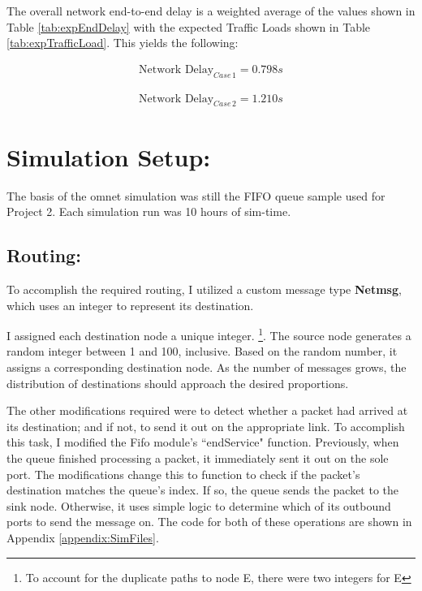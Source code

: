 \documentclass{article}
\begin{document}
The overall network end-to-end delay is a weighted average of the values shown in Table \ref{tab:expEndDelay} with the expected Traffic Loads shown in Table \ref{tab:expTrafficLoad}.
This yields the following:
\newline

\begin{minipage}{0.5\textwidth}
\begin{align*}
\text{Network Delay}_{Case \, 1} = 0.798s
\end{align*}
\end{minipage}
\begin{minipage}{0.5\textwidth}
\begin{align*}
\text{Network Delay}_{Case \, 2} = 1.210s
\end{align*}
\end{minipage}
\newline 

\newpage
\section{Simulation Setup:}
\label{sec:SimSetup}

The basis of the omnet simulation was still the FIFO queue sample used for Project 2.
Each simulation run was 10 hours of sim-time.

\subsection{Routing:}
\label{subsec:RoutingSetup}
To accomplish the required routing, I utilized a custom message type \textbf{Netmsg}, which uses an integer to represent its destination.

I assigned each destination node a unique integer. \footnote{To account for the duplicate paths to node E, there were two integers for E}.
The source node generates a random integer between 1 and 100, inclusive.  Based on the random number, it assigns a corresponding destination node.
As the number of messages grows, the distribution of destinations should approach the desired proportions.

The other modifications required were to detect whether a packet had arrived at its destination; and if not, to send it out on the appropriate link.
To accomplish this task, I modified the Fifo module's ``endService" function.
Previously, when the queue finished processing a packet, it immediately sent it out on the sole port.
The modifications change this to function to check if the packet's destination matches the queue's index.  
If so, the queue sends the packet to the sink node.
Otherwise, it uses simple logic to determine which of its outbound ports to send the message on.
The code for both of these operations are shown in Appendix \ref{appendix:SimFiles}.
\end{document}
